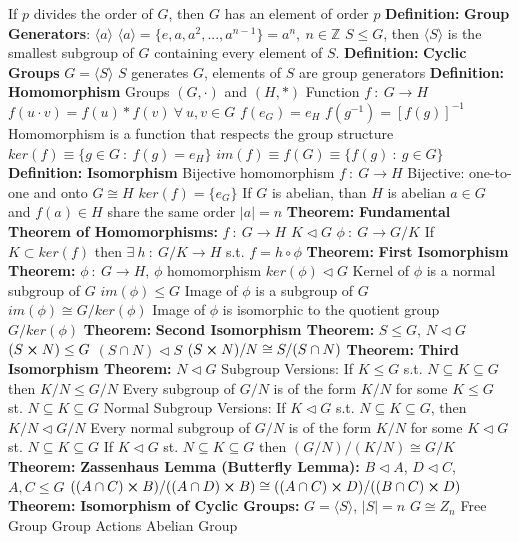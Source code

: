 \documentclass[14pt]{extarticle}
\def\Definition{{\color{blue} \textbf{Definition:} }}
\def\Theorem{{\color{red} \textbf{Theorem:} }}
\begin{document}
\begin{outline}
			\2	If $p$ divides the order of $G$, then $G$ has an element of order $p$
		\1	\Definition \textbf{Group Generators}: $\langle a \rangle$
			\2	$\langle a \rangle = \{e,a,a^2,...,a^{n-1}\} = a^n,~n \in \mathbb{Z}$
			\2	$S \le G$, then $\langle S \rangle$ is the smallest subgroup of $G$ containing
					every element of $S$.
		\1	\Definition \textbf{Cyclic Groups}
			\2	$G = \langle S \rangle$
			\2	$S$ generates $G$, elements of $S$ are group generators		
		\1	\Definition \textbf{Homomorphism}
			\2	Groups $(G,\cdot)$ and $(H,*)$
			\2	Function $f~:~G \rightarrow H$
				\3	$f(u \cdot v) = f(u) * f(v)~\forall~u,v \in G$
				\3	$f(e_G) = e_H$
				\3	$f(g^{-1}) = [f(g)]^{-1}$
			\2	Homomorphism is a function that respects the group structure
			\2	$ker(f) \equiv \{g \in G~:~f(g) = e_H\}$
			\2	$im(f) \equiv f(G) \equiv \{f(g)~:~g \in G\}$	
		\1	\Definition \textbf{Isomorphism}
			\2	Bijective homomorphism $f~:~G \rightarrow H$
				\3	Bijective: one-to-one and onto
			\2	$G \cong H$
			\2	$ker(f) = \{e_G\}$
			\2	If $G$ is abelian, than $H$ is abelian
			\2	$a \in G$ and $f(a) \in H$ share the same order $|a| = n$		
		\1	\Theorem \textbf{Fundamental Theorem of Homomorphisms:}
			\2	$f~:~G \rightarrow H$
			\2	$K \triangleleft G$
			\2	$\phi~:~G \rightarrow G/K$
			\2	{\color{purple}If $K \subset ker(f)$ then $\exists~h~:~G/K \rightarrow H$ 
						s.t. $f = h \circ \phi$}
		\1	\Theorem \textbf{First Isomorphism Theorem:}
			\2	$\phi~:~G \rightarrow H$, $\phi$ homomorphism
			\2	{\color{purple} $ker(\phi) \triangleleft G$}
				\3	Kernel of $\phi$ is a normal subgroup of $G$
			\2	{\color{purple} $im(\phi) \le G$}
				\3	Image of $\phi$ is a subgroup of $G$
			\2	{\color{purple} $im(\phi) \cong G/ker(\phi)$}
				\3	Image of $\phi$ is isomorphic to the quotient group $G/ker(\phi)$
		\1	\Theorem	\textbf{Second Isomorphism Theorem:}
			\2	$S \le G$, $N \triangleleft G$
			\2	{\color{purple}$(S \cross N) \le G$}
			\2	{\color{purple}$(S \cap N) \triangleleft S$}
			\2	{\color{purple}$(S \cross N)/N \cong S/(S\cap N)$}
		\1	\Theorem \textbf{Third Isomorphism Theorem:}
			\2	$N \triangleleft G$
			\2	Subgroup Versions:
				\3	{\color{purple} If $K \le G$ s.t. $N \subseteq K \subseteq G$ then 
							$K/N \le G/N$}
				\3	{\color{purple} Every subgroup of $G/N$ is of the form $K/N$ for 
						some $K \le G$ st. $N \subseteq K \subseteq G$}
			\2	Normal Subgroup Versions:
				\3	{\color{purple} If $K \triangleleft G$ s.t. $N \subseteq K \subseteq G$,
						then $K / N \triangleleft G/N$}
				\3	{\color{purple} Every normal subgroup of $G/N$ is of the form $K/N$
						for some $K \triangleleft G$ st. $N \subseteq K \subseteq G$}
				\3	{\color{purple} If $K \triangleleft G$ st. $N \subseteq K \subseteq G$ 
						then $(G/N)/(K/N) \cong G/K$}
		\1	\Theorem	\textbf{Zassenhaus Lemma (Butterfly Lemma):}
			\2	$B \triangleleft A$, $D \triangleleft C$, $A,C \le G$
			\2	{\color{purple} $((A \cap C) \cross B) / ((A \cap D) \cross B) \cong
						((A \cap C) \cross D) / ((B \cap C)\cross D)$}	
	\1	\Theorem \textbf{Isomorphism of Cyclic Groups:}
			\2	$G = \langle S \rangle$, $|S| = n$
			\2	{\color{purple} $G \cong Z_n$}
	\1	Free Group		
	\1	Group Actions
	\1	Abelian Group
	
	\end{outline}
\end{document}
